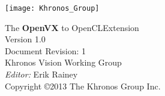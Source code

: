 \documentclass[oneside]{book}
\begin{document}
\hypersetup{pageanchor=false,citecolor=blue}
\begin{titlepage}
\vspace*{2cm}
\texttt{[image: Khronos\_Group]}
\vspace*{2cm}
\begin{center}
{\Huge The {\bf OpenVX\texttrademark} to OpenCL\texttrademark Extension} \\
\vspace*{1cm}
{\Large Version 1.0} \\
\vspace*{0.25cm}
{\Large Document Revision: 1} \\
\vspace*{1cm}
{\Large Khronos Vision Working Group} \\
\vspace*{1cm}
{\Large {\it Editor:} Erik Rainey} \\
\vspace*{1cm}
{\Large Copyright \copyright 2013 The Khronos Group Inc.} \\
\end{center}
\end{titlepage}
\end{document}
